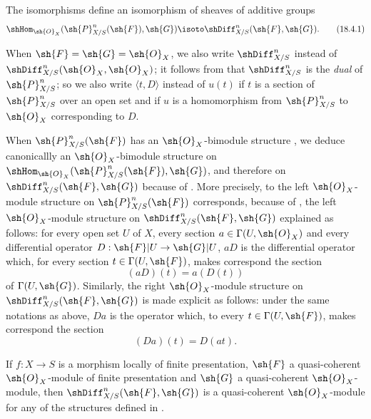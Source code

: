 \begin{proposition}[16.8.4]
\label{IV.16.8.4}
The isomorphisms  define an isomorphism of sheaves of additive groups
\[
  \label{IV.16.8.4.1}
  \shHom_{\sh{O}_X}(\sh{P}_{X/S}^n(\sh{F}), \sh{G}) \isoto \shDiff_{X/S}^n(\sh{F}, \sh{G}).
  \tag{18.4.1}
\]
\end{proposition}

When $\sh{F} = \sh{G} = \sh{O}_X$, we also write $\shDiff_{X/S}^n$ instead of $\shDiff_{X/S}^n(\sh{O}_X, \sh{O}_X)$;
it follows from  that $\shDiff_{X/S}^n$ is the \emph{dual} of $\sh{P}_{X/S}^n$;
so we also write $\langle t, D \rangle$ instead of $u(t)$ if $t$ is a section of $\sh{P}_{X/S}^n$ over an open set and if $u$ is a homomorphism from $\sh{P}_{X/S}^n$ to $\sh{O}_X$ corresponding to $D$.

\begin{env}[16.8.5]
\label{IV.16.8.5}
When $\sh{P}_{X/S}^n(\sh{F})$ has an $\sh{O}_X$-bimodule structure , we deduce canonicallly an $\sh{O}_X$-bimodule structure on $\shHom_{\sh{O}_X}(\sh{P}_{X/S}^n(\sh{F}), \sh{G})$, and therefore on $\shDiff_{X/S}^n(\sh{F}, \sh{G})$ because of .
More precisely, to the left $\sh{O}_X$-module structure on $\sh{P}_{X/S}^n(\sh{F})$ corresponds, because of , the left $\sh{O}_X$-module structure on $\shDiff_{X/S}^n(\sh{F}, \sh{G})$ explained as follows:
for every open set $U$ of $X$, every section $a \in \Gamma(U, \sh{O}_X)$ and every differential operator $D: \sh{F}|U \to \sh{G}|U$, $aD$ is the differential operator which, for every section $t \in \Gamma(U, \sh{F})$, makes correspond the section
\[
  \label{IV.16.8.5.1}
  (aD)(t) = a(D(t))
  \tag{16.8.5.1}
\]
of $\Gamma(U, \sh{G})$.
Similarly, the right $\sh{O}_X$-module structure on $\shDiff_{X/S}^n(\sh{F}, \sh{G})$ is made explicit as follows:
under the same notations as above, $Da$ is the operator which, to every $t \in \Gamma(U, \sh{F})$, makes correspond the section
\[
  \label{IV.16.8.5.2}
  (Da)(t) = D(at).
  \tag{16.8.5.2}
\]
\end{env}

\begin{proposition}[16.8.6]
\label{IV.16.8.6}
If $f:X \to S$ is a morphism locally of finite presentation, $\sh{F}$ a quasi-coherent $\sh{O}_X$-module of finite presentation and $\sh{G}$ a quasi-coherent $\sh{O}_X$-module, then $\shDiff_{X/S}^n(\sh{F}, \sh{G})$ is a quasi-coherent $\sh{O}_X$-module for any of the structures defined in .
\end{proposition}

